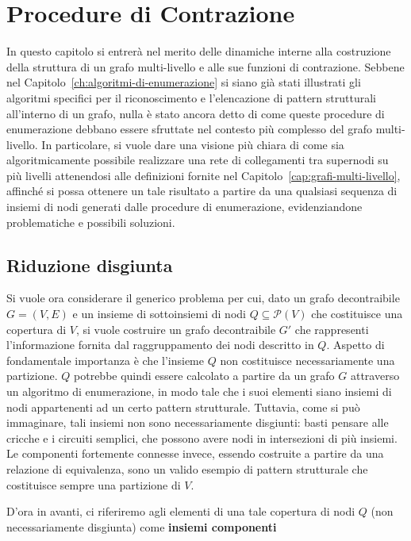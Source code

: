 \chapter{Procedure di Contrazione}\label{cap:proc_contr}

In questo capitolo si entrerà nel merito delle dinamiche interne alla costruzione della struttura di un grafo
multi-livello e alle sue funzioni di contrazione.
Sebbene nel Capitolo~\ref{ch:algoritmi-di-enumerazione} si siano già stati illustrati gli
algoritmi specifici per il riconoscimento e l'elencazione di pattern strutturali all'interno di un grafo,
nulla è stato ancora detto di come queste procedure di enumerazione debbano essere sfruttate nel contesto più
complesso del grafo multi-livello.
In particolare, si vuole dare una visione più chiara di come sia algoritmicamente
possibile realizzare una rete di collegamenti tra supernodi su più livelli attenendosi alle definizioni
fornite nel Capitolo~\ref{cap:grafi-multi-livello}, affinché si possa ottenere un tale risultato a partire da una
qualsiasi sequenza di insiemi di nodi generati dalle procedure di enumerazione, evidenziandone problematiche e
possibili soluzioni.

\section{Riduzione disgiunta}

Si vuole ora considerare il generico problema per cui, dato un grafo decontraibile $G = (V, E)$ e un insieme di
sottoinsiemi di nodi $Q \subseteq \mathcal{P}(V)$ che costituisce una copertura di $V$, si vuole costruire un grafo
decontraibile $G'$ che rappresenti l'informazione fornita dal raggruppamento dei nodi descritto in $Q$.
Aspetto di fondamentale importanza è che l'insieme $Q$ non costituisce necessariamente una partizione.
$Q$ potrebbe quindi essere calcolato a partire da un grafo $G$ attraverso un algoritmo di enumerazione, in modo tale
che i suoi elementi siano insiemi di nodi appartenenti ad un certo pattern strutturale.
Tuttavia, come si può immaginare, tali insiemi non sono necessariamente disgiunti: basti pensare alle cricche e i
circuiti semplici, che possono avere nodi in intersezioni di più insiemi.
Le componenti fortemente connesse invece, essendo costruite a partire da una relazione di equivalenza, sono un
valido esempio di pattern strutturale che costituisce sempre una partizione di $V$. \newline

D'ora in avanti, ci riferiremo agli elementi di una tale copertura di nodi $Q$ (non necessariamente disgiunta)
come \textbf{insiemi componenti} \newline

